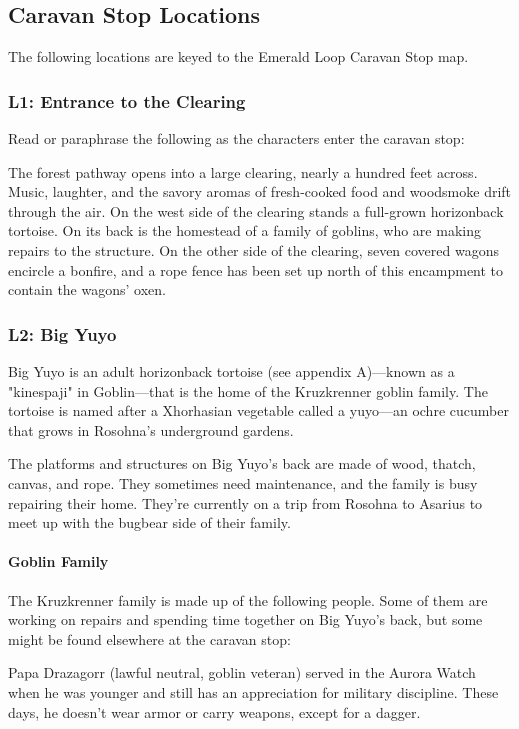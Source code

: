 \documentclass[10pt,a4paper,twoside,bg=print,twocolumn,openany,nodeprecatedcode]{dndbook}
\begin{document}
\subsection{Caravan Stop Locations}
The following locations are keyed to the Emerald Loop Caravan Stop map.


\subsubsection{L1: Entrance to the Clearing}
Read or paraphrase the following as the characters enter the caravan stop:

\begin{DndReadAloud}{}
The forest pathway opens into a large clearing, nearly a hundred feet across. Music, laughter, and the savory aromas of fresh-cooked food and woodsmoke drift through the air. On the west side of the clearing stands a full-grown horizonback tortoise. On its back is the homestead of a family of goblins, who are making repairs to the structure. On the other side of the clearing, seven covered wagons encircle a bonfire, and a rope fence has been set up north of this encampment to contain the wagons' oxen.

\end{DndReadAloud}

\subsubsection{L2: Big Yuyo}
Big Yuyo is an adult horizonback tortoise (see appendix A)—known as a "kinespaji" in Goblin—that is the home of the Kruzkrenner goblin family. The tortoise is named after a Xhorhasian vegetable called a yuyo—an ochre cucumber that grows in Rosohna's underground gardens.

The platforms and structures on Big Yuyo's back are made of wood, thatch, canvas, and rope. They sometimes need maintenance, and the family is busy repairing their home. They're currently on a trip from Rosohna to Asarius to meet up with the bugbear side of their family.

\paragraph{Goblin Family}
The Kruzkrenner family is made up of the following people. Some of them are working on repairs and spending time together on Big Yuyo's back, but some might be found elsewhere at the caravan stop:

Papa Drazagorr (lawful neutral, goblin veteran) served in the Aurora Watch when he was younger and still has an appreciation for military discipline. These days, he doesn't wear armor or carry weapons, except for a dagger.
\end{document}

